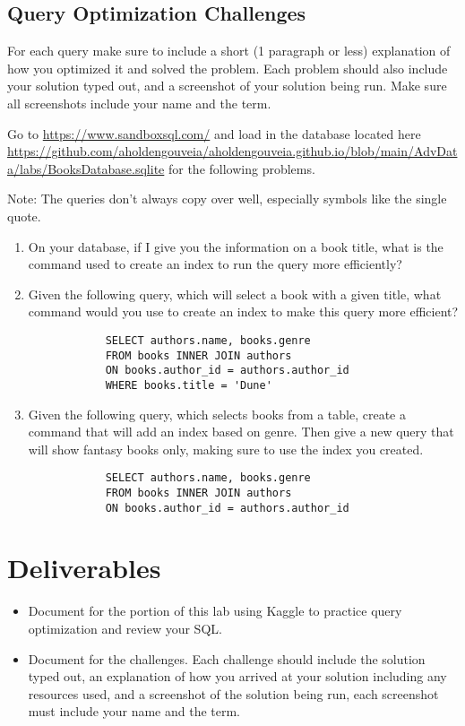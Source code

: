 \documentclass[12pt]{article}
\begin{document}
\subsection*{Query Optimization Challenges}
For each query make sure to include a short (1 paragraph or less) explanation of how you optimized it and solved the problem.  Each problem should also include your solution typed out, and a screenshot of your solution being run.  Make sure all screenshots include your name and the term.

Go to \url{https://www.sandboxsql.com/} and load in the database located here \url{https://github.com/aholdengouveia/aholdengouveia.github.io/blob/main/AdvData/labs/BooksDatabase.sqlite} for the following problems. 

Note: The queries don't always copy over well, especially symbols like the single quote.

    \begin{enumerate}
        \item On your database, if I give you the information on a book title, what is the command used to create an index to run the query more efficiently?
        \item Given the following query, which will select a book with a given title, what command would you use to create an index to make this query more efficient? 
        \begin{verbatim}
            SELECT authors.name, books.genre
            FROM books INNER JOIN authors 
            ON books.author_id = authors.author_id
            WHERE books.title = 'Dune' 
        \end{verbatim}
        \item Given the following query, which selects books from a table, create a command that will add an index based on genre.  Then give a new query that will show fantasy books only, making sure to use the index you created.
        \begin{verbatim}
            SELECT authors.name, books.genre
            FROM books INNER JOIN authors 
            ON books.author_id = authors.author_id 
        \end{verbatim}
    \end{enumerate}



\section*{Deliverables}
\begin{itemize}
    \item Document for the portion of this lab using Kaggle to practice query optimization and review your SQL. 
    \item Document for the challenges.  Each challenge should include the solution typed out, an explanation of how you arrived at your solution including any resources used, and a screenshot of the solution being run, each screenshot must include your name and the term. 

\end{itemize}
\end{document}
